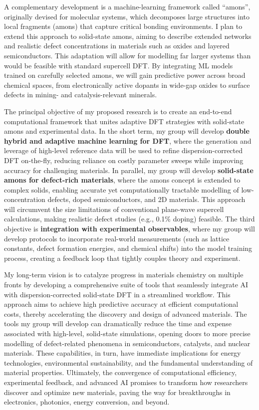 \documentclass[11pt,letterpaper]{article}
\begin{document}
A complementary development is a machine-learning framework called “amons”\cite{amons}, originally devised for molecular systems, which decomposes large structures into local fragments (amons) that capture critical bonding environments. I plan to extend this approach to solid-state amons, aiming to describe extended networks and realistic defect concentrations in materials such as oxides and layered semiconductors. This adaptation will allow for modelling far larger systems than would be feasible with standard supercell DFT. By integrating ML models trained on carefully selected amons, we will gain predictive power across broad chemical spaces, from electronically active dopants in wide-gap oxides to surface defects in mining- and catalysis-relevant minerals.

The principal objective of my proposed research is to create an end-to-end computational framework that unites adaptive DFT strategies with solid-state amons and experimental data. In the short term, my group will develop \textbf{double hybrid and adaptive machine learning for DFT}, where the generation and leverage of high-level reference data will be used to refine dispersion-corrected DFT on-the-fly, reducing reliance on costly parameter sweeps while improving accuracy for challenging materials. In parallel, my group will develop \textbf{solid-state amons for defect-rich materials}, where the amons concept is extended to complex solids, enabling accurate yet computationally tractable modelling of low-concentration defects, doped semiconductors, and 2D materials. This approach will circumvent the size limitations of conventional plane-wave supercell calculations, making realistic defect studies (e.g., 0.1\% doping) feasible. The third objective is \textbf{integration with experimental observables}, where my group will develop protocols to incorporate real-world measurements (such as lattice constants, defect formation energies, and chemical shifts) into the model training process, creating a feedback loop that tightly couples theory and experiment.

My long-term vision is to  catalyze progress in materials chemistry on multiple fronts by developing a comprehensive suite of tools that seamlessly integrate AI with dispersion-corrected solid-state DFT in a streamlined workflow. This approach aims to achieve high predictive accuracy at efficient computational costs, thereby accelerating the discovery and design of advanced materials. 
The tools my group will develop can dramatically reduce the time and expense associated with high-level, solid-state simulations, opening doors to more precise modelling of defect-related phenomena in semiconductors, catalysts, and nuclear materials. These capabilities, in turn, have immediate implications for energy technologies, environmental sustainability, and the fundamental understanding of material properties. Ultimately, the convergence of computational efficiency, experimental feedback, and advanced AI promises to transform how researchers discover and optimize new materials, paving the way for breakthroughs in electronics, photonics, energy conversion, and beyond.
\end{document}
